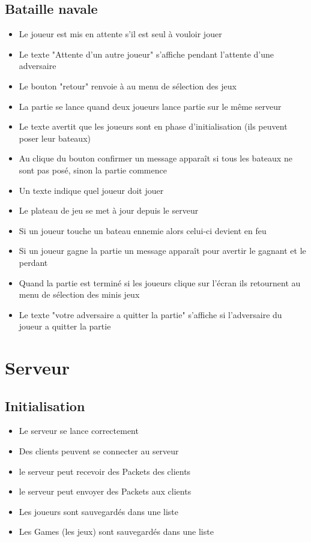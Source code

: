 \documentclass{report}
\begin{document}
\subsection{Bataille navale}
\begin{itemize}
  \item Le joueur est mis en attente s'il est seul à vouloir jouer
  \item Le texte "Attente d'un autre joueur" s'affiche pendant l'attente d'une adversaire
  \item Le bouton "retour" renvoie à au menu de sélection des jeux
  \item La partie se lance quand deux joueurs lance partie sur le même serveur
  \item Le texte avertit que les joueurs sont en phase d'initialisation (ils peuvent poser leur bateaux)
  \item Au clique du bouton confirmer un message apparaît si tous les bateaux ne sont pas posé, sinon la partie commence
  \item Un texte indique quel joueur doit jouer
  \item Le plateau de jeu se met à jour depuis le serveur
  \item Si un joueur touche un bateau ennemie alors celui-ci devient en feu
  \item Si un joueur gagne la partie un message apparaît pour avertir le gagnant et le perdant
  \item Quand la partie est terminé si les joueurs clique sur l'écran ils retournent au menu de sélection des minis jeux
  \item Le texte "votre adversaire a quitter la partie" s'affiche si l'adversaire du joueur a quitter la partie
\end{itemize}

\section{Serveur}

\subsection{Initialisation}
\begin{itemize}
  \item Le serveur se lance correctement
  \item Des clients peuvent se connecter au serveur
  \item le serveur peut recevoir des Packets des clients
  \item le serveur peut envoyer des Packets aux clients
  \item Les joueurs sont sauvegardés dans une liste
  \item Les Games (les jeux) sont sauvegardés dans une liste
\end{itemize}
\end{document}
